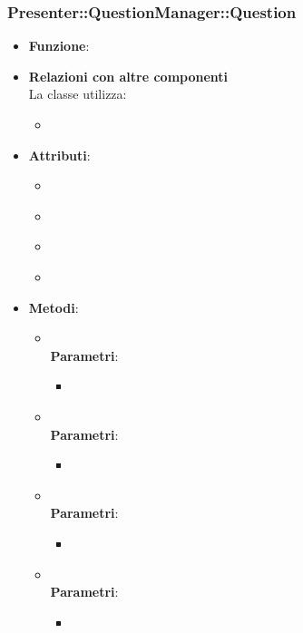 \subsubsection{Presenter::QuestionManager::Question}
\begin{itemize}
\item\textbf{Funzione}:
\item\textbf{Relazioni con altre componenti}\\
La classe utilizza:
	\begin{itemize}
		\item
	\end{itemize}
\item\textbf{Attributi}:
	\begin{itemize}
		\item\code{}\\
		\item\code{}\\
		\item\code{}\\
		\item\code{}\\
	\end{itemize}
\item\textbf{Metodi}:
	\begin{itemize}
		\item\code{}\\
		\textbf{Parametri}:
			\begin{itemize}
				\item\code{}\\
			\end{itemize}
		\item\code{}\\
		\textbf{Parametri}:
			\begin{itemize}
				\item\code{}\\
			\end{itemize}
		\item\code{}\\
		\textbf{Parametri}:
			\begin{itemize}
				\item\code{}\\
			\end{itemize}
		\item\code{}\\
		\textbf{Parametri}:
			\begin{itemize}
				\item\code{}\\
			\end{itemize}
	\end{itemize}
\end{itemize}

